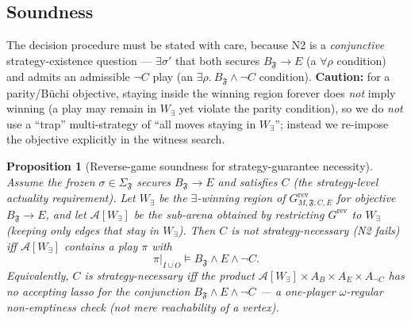 \documentclass[11pt]{article}
\newtheorem{proposition}{Proposition}
\theoremstyle{remark}
\newcommand{\Frame}{\mathfrak{F}}
\begin{document}
\subsection{Soundness}

The decision procedure must be stated with care, because N2 is a
\emph{conjunctive} strategy-existence question --- \(\exists\sigma'\) that both
secures \(B_{\Frame}\rightarrow E\) (a \(\forall\rho\) condition) and admits an
admissible \(\neg C\) play (an \(\exists\rho.\ B_{\Frame}\wedge\neg C\) condition).
\textbf{Caution:} for a parity/B\"uchi objective, staying inside the winning
region forever does \emph{not} imply winning (a play may remain in \(W_\exists\)
yet violate the parity condition), so we do \emph{not} use a ``trap''
multi-strategy of ``all moves staying in \(W_\exists\)''; instead we re-impose the
objective explicitly in the witness search.

\begin{proposition}[Reverse-game soundness for strategy-guarantee necessity]
\label{prop:rpg-sound}
Assume the frozen \(\sigma\in\Sigma_{\Frame}\) secures \(B_{\Frame}\rightarrow E\)
and satisfies \(C\) (the strategy-level actuality requirement). Let \(W_\exists\)
be the \(\exists\)-winning region of \(G^{\mathrm{rev}}_{M,\Frame,C,E}\) for
objective \(B_{\Frame}\rightarrow E\), and let \(\mathcal{A}[W_\exists]\) be the
sub-arena obtained by restricting \(G^{\mathrm{rev}}\) to \(W_\exists\) (keeping
only edges that stay in \(W_\exists\)). Then \(C\) is \emph{not}
strategy-necessary (N2 fails) iff \(\mathcal{A}[W_\exists]\) contains a play
\(\pi\) with
\[
  \pi|_{I\cup O}\models B_{\Frame}\wedge E\wedge\neg C .
\]
Equivalently, \(C\) is strategy-necessary iff the product
\(\mathcal{A}[W_\exists]\times A_B\times A_E\times A_{\neg C}\) has no accepting
lasso for the conjunction \(B_{\Frame}\wedge E\wedge\neg C\) --- a one-player
\(\omega\)-regular non-emptiness check (not mere reachability of a vertex).
\end{proposition}
\end{document}
